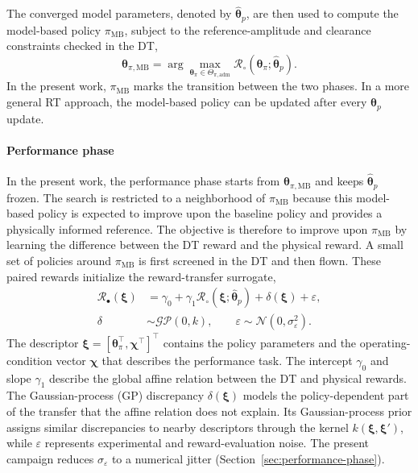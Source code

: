 \documentclass[journal]{IEEEtran}
\begin{document}
The converged model parameters, denoted by $\widehat{\boldsymbol{\theta}}_p$, are then used to compute the model-based policy $\pi_{\mathrm{MB}}$, subject to the reference-amplitude and clearance constraints checked in the DT,
\begin{equation}
\boldsymbol{\theta}_{\pi,\mathrm{MB}}
=
\arg\max_{\boldsymbol{\theta}_{\pi}\in\Theta_{\pi,\mathrm{adm}}}
\mathcal R_{\circ}\!\left(
\boldsymbol{\theta}_{\pi};
\widehat{\boldsymbol{\theta}}_p
\right).
\label{eq:rt-mb-optimum}
\end{equation}
In the present work, $\pi_{\mathrm{MB}}$ marks the transition between the two phases. In a more general RT approach, the model-based policy can be updated after every $\boldsymbol{\theta}_p$ update.

\paragraph*{Performance phase}
In the present work, the performance phase starts from $\boldsymbol{\theta}_{\pi,\mathrm{MB}}$ and keeps $\widehat{\boldsymbol{\theta}}_p$ frozen. The search is restricted to a neighborhood of $\pi_{\mathrm{MB}}$ because this model-based policy is expected to improve upon the baseline policy and provides a physically informed reference. The objective is therefore to improve upon $\pi_{\mathrm{MB}}$ by learning the difference between the DT reward and the physical reward. A small set of policies around $\pi_{\mathrm{MB}}$ is first screened in the DT and then flown. These paired rewards initialize the reward-transfer surrogate,
\begin{equation}
\begin{aligned}
\mathcal R_{\bullet}(\boldsymbol\xi)
&=\gamma_0+
\gamma_1\mathcal R_{\circ}
(\boldsymbol\xi;\widehat{\boldsymbol{\theta}}_p)
+\delta(\boldsymbol\xi)+\varepsilon,\\
\delta&\sim\mathcal{GP}(0,k),\qquad
\varepsilon\sim\mathcal N(0,\sigma_{\varepsilon}^{2}).
\end{aligned}
\label{eq:rt-surrogate}
\end{equation}
The descriptor $\boldsymbol\xi=[\boldsymbol{\theta}_{\pi}^{\top},\boldsymbol\chi^{\top}]^{\top}$ contains the policy parameters and the operating-condition vector $\boldsymbol\chi$ that describes the performance task. The intercept $\gamma_0$ and slope $\gamma_1$ describe the global affine relation between the DT and physical rewards. The Gaussian-process (GP) discrepancy $\delta(\boldsymbol\xi)$ models the policy-dependent part of the transfer that the affine relation does not explain. Its Gaussian-process prior assigns similar discrepancies to nearby descriptors through the kernel $k(\boldsymbol\xi,\boldsymbol\xi')$, while $\varepsilon$ represents experimental and reward-evaluation noise. The present campaign reduces $\sigma_{\varepsilon}$ to a numerical jitter (Section~\ref{sec:performance-phase}).
\end{document}

